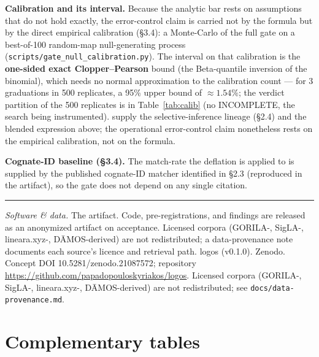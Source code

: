 \textbf{Calibration and its interval.} Because the analytic bar rests on
assumptions that do not hold exactly, the error-control claim is carried not
by the formula but by the direct empirical calibration (\S3.4): a
Monte-Carlo of the full gate on a best-of-100 random-map null-generating
process (\texttt{scripts/\allowbreak gate\_null\_calibration.py}). The
interval on that calibration is the \textbf{one-sided exact
Clopper--Pearson} bound (the Beta-quantile inversion of the binomial), which
needs no normal approximation to the calibration count --- for 3 graduations
in 500 replicates, a 95\% upper bound of $\approx 1.54\%$; the verdict
partition of the 500 replicates is in Table~\ref{tab:calib} (no
INCOMPLETE, the search being instrumented).
\citet{bailey2014} supply the selective-inference lineage (\S2.4) and the
blended expression above; the operational error-control claim nonetheless
rests on the empirical calibration, not on the formula.

\textbf{Cognate-ID baseline (\S3.4).} The match-rate the deflation is
applied to is supplied by the published cognate-ID matcher identified in
\S2.3 (reproduced in the artifact), so the gate does not depend on any
single citation.

\begin{center}\rule{0.5\columnwidth}{0.4pt}\end{center}

\noindent\emph{Software \& data.}
\ifanon
The artifact. Code, pre-registrations, and findings are released as an
anonymized artifact on acceptance. Licensed corpora (GORILA-, SigLA-,
lineara.xyz-, D\=AMOS-derived) are not redistributed; a data-provenance note
documents each source's licence and retrieval path.
\else
logos (v0.1.0). Zenodo. Concept DOI 10.5281/zenodo.21087572; repository
\url{https://github.com/papadopouloskyriakos/logos}. Licensed corpora
(GORILA-, SigLA-, lineara.xyz-, D\=AMOS-derived) are not redistributed; see
\texttt{docs/data-provenance.md}.
\fi

\section{Complementary tables}

